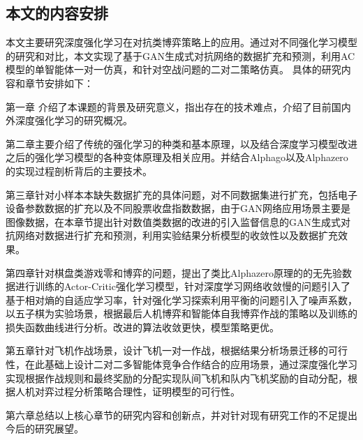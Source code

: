 \subsection{本文的内容安排}
本文主要研究深度强化学习在对抗类博弈策略上的应用。通过对不同强化学习模型的研究和对比，本文实现了基于GAN生成式对抗网络的数据扩充和预测，利用AC模型的单智能体一对一仿真，和针对空战问题的二对二策略仿真。
具体的研究内容和章节安排如下：

第一章 介绍了本课题的背景及研究意义，指出存在的技术难点，介绍了目前国内外深度强化学习的研究概况。

第二章主要介绍了传统的强化学习的种类和基本原理，以及结合深度学习模型改进之后的强化学习模型的各种变体原理及相关应用。并结合Alphago以及Alphazero的实现过程剖析背后的主要技术。

第三章针对小样本本缺失数据扩充的具体问题，对不同数据集进行扩充，包括电子设备参数数据的扩充以及不同股票收盘指数数据，由于GAN网络应用场景主要是图像数据，在本章节提出针对数值类数据的改进的引入监督信息的GAN生成式对抗网络对数据进行扩充和预测，利用实验结果分析模型的收敛性以及数据扩充效果。

第四章针对棋盘类游戏零和博弈的问题，提出了类比Alphazero原理的的无先验数据进行训练的Actor-Critic强化学习模型，针对深度学习网络收敛慢的问题引入了基于相对熵的自适应学习率，针对强化学习探索利用平衡的问题引入了噪声系数，以五子棋为实验场景，根据最后人机博弈和智能体自我博弈作战的策略以及训练的损失函数曲线进行分析。改进的算法收敛更快，模型策略更优。

第五章针对飞机作战场景，设计飞机一对一作战，根据结果分析场景迁移的可行性，在此基础上设计二对二多智能体竞争合作结合的应用场景，通过深度强化学习实现根据作战规则和最终奖励的分配实现队间飞机和队内飞机奖励的自动分配，根据人机对弈过程分析策略合理性，证明模型的可行性。

第六章总结以上核心章节的研究内容和创新点，并对针对现有研究工作的不足提出今后的研究展望。
